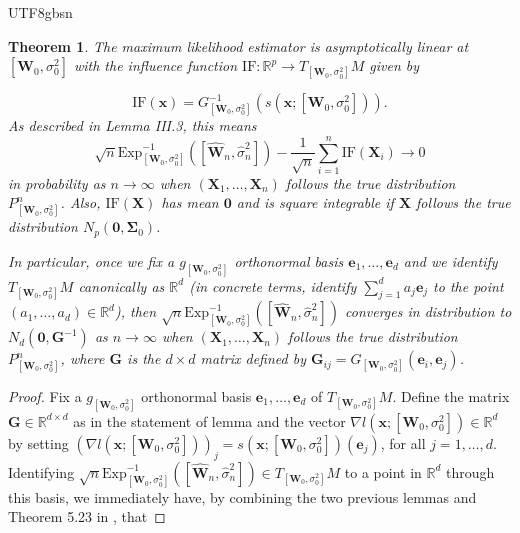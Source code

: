 \documentclass[12pt]{report}
\newcommand{\bracket}[1]{\left ( #1 \right )}
\newcommand{\squared}[1]{\left [ #1 \right ]}
\theoremstyle{plain}
\newtheorem{theorem}{Theorem}
\theoremstyle{definition}
\begin{document}
\begin{CJK*}{UTF8}{gbsn}
\begin{theorem}\label{thm:asc_linearity}
The maximum likelihood estimator is asymptotically linear at $[\bm{W}_0, \sigma_0^2]$
with the influence function $\text{IF}: \mathbb{R}^p \to T_{[\bm{W}_0, \sigma_0^2]}M$
given by 

\begin{equation}\label{eq:influence_function}
  \text{IF}(\bm{x}) = G_{[\bm{W}_0, \sigma_0^2]}^{-1}(s(\bm{x}; [\bm{W}_0, \sigma_0^2])).
\end{equation}
As described in \cite{Sun_Lin_Liu_2026} Lemma III.3, this means
\begin{equation}\label{eq:asc_linearity}
  \sqrt{n} \text{Exp}^{-1}_{[\bm{W}_0, \sigma_0^2]}\bracket{\squared{\hat{\bm{W}}_n,\hat{\sigma}_n^2}}
  - \frac{1}{\sqrt{n}} \sum_{i=1}^n \text{IF}(\bm{X}_i) \to 0
\end{equation}
in probability as $n \to \infty$ when $(\bm{X}_1, \ldots, \bm{X}_n)$
follows the true distribution $P^n_{[\bm{W}_0, \sigma_0^2]}$.
Also, $\text{IF}(\bm{X})$ has mean $\bm{0}$ and is square integrable if $\bm{X}$
follows the true distribution $N_p(\bm{0}, \bm{\Sigma}_0)$.

In particular, 
once we fix a $g_{[\bm{W}_0, \sigma_0^2]}$ orthonormal basis $\bm{e}_1, \ldots, \bm{e}_d$
and we identify $T_{[\bm{W}_0, \sigma_0^2]}M$ canonically as $\mathbb{R}^d$
(in concrete terms, identify $\sum_{j=1}^d a_j \bm{e}_j$ to the point $(a_1, \ldots, a_d) \in \mathbb{R}^d$),
then
$\sqrt{n} \text{Exp}^{-1}_{[\bm{W}_0, \sigma_0^2]}\bracket{\squared{\hat{\bm{W}}_n,\hat{\sigma}_n^2}}$
converges in distribution to $N_d(\bm{0}, \bm{G}^{-1})$ as $n \to \infty$ when $(\bm{X}_1, \ldots, \bm{X}_n)$
follows the true distribution $P^n_{[\bm{W}_0, \sigma_0^2]}$,
where $\bm{G}$ is the $d \times d$ 
matrix defined by $\bm{G}_{ij} = G_{[\bm{W}_0, \sigma_0^2]}(\bm{e}_i, \bm{e}_j)$.
\end{theorem}

\begin{proof}
Fix a $g_{[\bm{W}_0, \sigma_0^2]}$ orthonormal basis $\bm{e}_1, \ldots, \bm{e}_d$
of $T_{[\bm{W}_0, \sigma_0^2]}M$.
Define the matrix $\bm{G} \in \mathbb{R}^{d \times d}$ as in the statement of lemma 
and the vector $\nabla l(\bm{x}; [\bm{W}_0, \sigma_0^2]) \in \mathbb{R}^d$
by setting $(\nabla l(\bm{x}; [\bm{W}_0, \sigma_0^2]))_j = s(\bm{x}; [\bm{W}_0, \sigma_0^2])(\bm{e}_j)$,
for all $j = 1, \ldots, d$.
Identifying 
$\sqrt{n} \text{Exp}^{-1}_{[\bm{W}_0, \sigma_0^2]}\bracket{\squared{\hat{\bm{W}}_n,\hat{\sigma}_n^2}}
\in T_{[\bm{W}_0, \sigma_0^2]}M$ to a point in $\mathbb{R}^d$
through this basis,
we immediately have, by combining the two previous lemmas and Theorem 5.23 in \cite{van_der_Vaart_1998},
that


\end{proof}
\end{CJK*}
\end{document}
